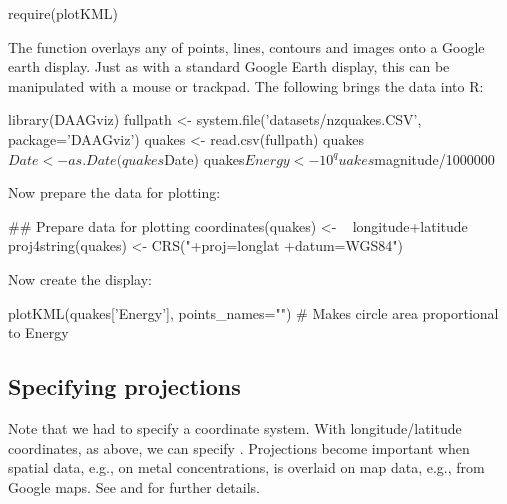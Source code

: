 \begin{Schunk}
\begin{Sinput}
require(plotKML)
\end{Sinput}
\end{Schunk}

The  function overlays any of points, lines, contours
and images onto a Google earth display.  Just as with a standard
Google Earth display, this can be manipulated with a mouse or
trackpad.  The following brings the data into R:
\begin{Schunk}
\begin{Sinput}
library(DAAGviz)
fullpath <- system.file('datasets/nzquakes.CSV',
                        package='DAAGviz')
quakes <- read.csv(fullpath)
quakes$Date <- as.Date(quakes$Date)
quakes$Energy <- 10^quakes$magnitude/1000000
\end{Sinput}
\end{Schunk}

Now prepare the data for plotting:
\begin{Schunk}
\begin{Sinput}
## Prepare data for plotting
coordinates(quakes) <- ~ longitude+latitude
proj4string(quakes) <-
  CRS("+proj=longlat +datum=WGS84")
\end{Sinput}
\end{Schunk}

Now create the display:
\begin{Schunk}
\begin{Sinput}
plotKML(quakes['Energy'], points_names="")
  # Makes circle area proportional to Energy
\end{Sinput}
\end{Schunk}

\subsection{Specifying projections}
Note that we had to specify a coordinate system.  With
longitude/latitude coordinates, as above, we can specify
. Projections become important when spatial data, e.g.,
on metal concentrations, is overlaid on map data, e.g., from Google
maps.  See  and  for further
details.

